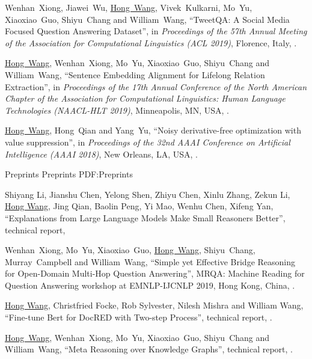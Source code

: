 \documentclass[letterpaper,MMMyyyy,nonstopmode]{simpleresumecv}
\begin{document}
\begin{Body}
\begin{enumerate}[label={[\arabic*]~~}]
\item
Wenhan~Xiong, Jiawei~Wu, \underline{Hong~Wang}, Vivek~Kulkarni, Mo~Yu, Xiaoxiao~Guo, Shiyu~Chang and William~Wang,
``TweetQA: A Social Media Focused Question Answering Dataset'',
in \textit{Proceedings of the 57th Annual Meeting of the Association for Computational Linguistics (ACL 2019)},
Florence, Italy,
.

\item
\underline{Hong~Wang}, Wenhan~Xiong, Mo~Yu, Xiaoxiao~Guo, Shiyu~Chang and William~Wang,
``Sentence Embedding Alignment for Lifelong Relation Extraction'',
in \textit{Proceedings of the 17th Annual Conference of the North American Chapter of the Association for Computational Linguistics: Human Language Technologies (NAACL-HLT 2019)},
Minneapolis, MN, USA,
.

\item
\underline{Hong~Wang}, Hong~Qian and Yang~Yu,
``Noisy derivative-free optimization with value suppression'',
in \textit{Proceedings of the 32nd AAAI Conference on Artificial Intelligence (AAAI 2018)},
New Orleans, LA, USA,
.
\end{enumerate}

\BigGap
\SubSection
{Preprints}
{Preprints}
{PDF:Preprints}
\begin{enumerate}[label={[\arabic*]~~}]
\item
Shiyang Li, Jianshu Chen, Yelong Shen, Zhiyu Chen, Xinlu Zhang, Zekun Li, \underline{Hong Wang}, Jing Qian, Baolin Peng, Yi Mao, Wenhu Chen, Xifeng Yan,
``Explanations from Large Language Models Make Small Reasoners Better'',
technical report,

\item
Wenhan~Xiong, Mo~Yu, Xiaoxiao~Guo, \underline{Hong~Wang}, Shiyu~Chang, Murray~Campbell and William~Wang,
``Simple yet Effective Bridge Reasoning for Open-Domain Multi-Hop Question Answering'',
MRQA: Machine Reading for Question Answering workshop at EMNLP-IJCNLP 2019, Hong Kong, China,
.

\item
\underline{Hong Wang}, Christfried Focke, Rob Sylvester, Nilesh Mishra and William Wang,
``Fine-tune Bert for DocRED with Two-step Process'',
technical report,
.

\item
\underline{Hong~Wang}, Wenhan~Xiong, Mo~Yu, Xiaoxiao~Guo, Shiyu~Chang and William~Wang,
``Meta Reasoning over Knowledge Graphs'',
technical report,
.
\end{enumerate}


\end{Body}
\end{document}

